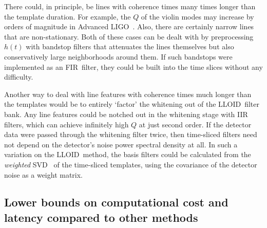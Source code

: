 \documentclass[preprint2]{aastex}
\newcommand{\LIGO}{LIGO}%
\newcommand{\SVD}{SVD}%
\newcommand{\fir}{FIR}%
\newcommand{\lloid}{LLOID}%
\begin{document}
There could, in principle, be lines with coherence times many times
longer than the template duration.  For example, the $Q$ of the violin
modes may increase by orders of magnitude in Advanced \LIGO~\citep{ALIGOSusp}.  Also,
there are certainly narrow lines that are non-stationary.  Both of these
cases can be dealt with by preprocessing $h(t)$ with bandstop filters
that attenuates the lines themselves but also conservatively large neighborhoods
around them.  If such bandstops were implemented as an \fir\ filter, they
could be built into the time slices without any difficulty.

Another way to deal with line features with coherence times much longer than the templates would be to entirely `factor' the whitening out of the \lloid\ filter bank.  Any line features could be notched out in the whitening stage with IIR filters, which can achieve infinitely high $Q$ at just second order.  If the detector data were passed through the whitening filter twice, then time-sliced filters need not depend on the detector's noise power spectral density at all.  In such a variation on the \lloid\ method, the basis filters could be calculated from the \emph{weighted} \SVD~\citep[Chapter 3.6]{WeightedSVD, jackson2003user} of the time-sliced templates, using the covariance of the detector noise as a weight matrix.

\subsection{Lower bounds on computational cost and latency compared to other
methods}
\end{document}
